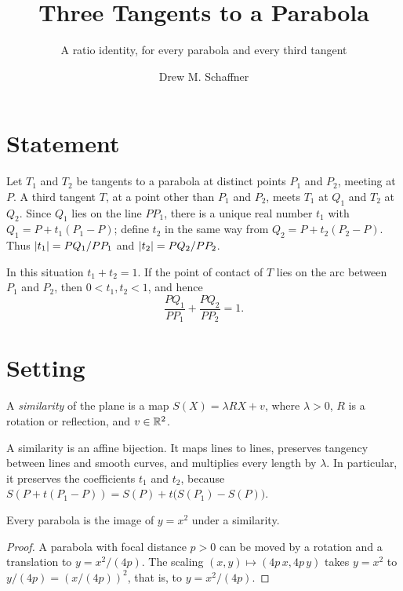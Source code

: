 \documentclass[11pt,a4paper]{article}
\title{Three Tangents to a Parabola}
\subtitle{A ratio identity, for every parabola and every third tangent}
\author{Drew M. Schaffner}
\begin{document}
\maketitle

\section{Statement}

Let $T_1$ and $T_2$ be tangents to a parabola at distinct points $P_1$ and $P_2$,
meeting at $P$. A third tangent $T$, at a point other than $P_1$ and $P_2$, meets
$T_1$ at $Q_1$ and $T_2$ at $Q_2$. Since $Q_1$ lies on the line $PP_1$, there is a
unique real number $t_1$ with $Q_1 = P + t_1 (P_1 - P)$; define $t_2$ in the same way
from $Q_2 = P + t_2 (P_2 - P)$. Thus $\lvert t_1\rvert = PQ_1 / PP_1$ and
$\lvert t_2\rvert = PQ_2 / PP_2$.

\begin{theorem}\label{thm:main}
  In this situation $t_1 + t_2 = 1$. If the point of contact of $T$ lies on the arc
  between $P_1$ and $P_2$, then $0 < t_1, t_2 < 1$, and hence
  \[
    \frac{PQ_1}{PP_1} + \frac{PQ_2}{PP_2} = 1.
  \]
\end{theorem}

\section{Setting}

\begin{definition}[Similarity]\label{def:similarity}
  A \emph{similarity} of the plane is a map $S(X) = \lambda R X + v$, where
  $\lambda > 0$, $R$ is a rotation or reflection, and $v \in \mathbb{R}^2$.
\end{definition}

A similarity is an affine bijection. It maps lines to lines, preserves tangency
between lines and smooth curves, and multiplies every length by $\lambda$. In
particular, it preserves the coefficients $t_1$ and $t_2$, because
$S(P + t (P_1 - P)) = S(P) + t \bigl( S(P_1) - S(P) \bigr)$.

\begin{lemma}\label{lem:normal-form}
  Every parabola is the image of $y = x^2$ under a similarity.
\end{lemma}

\begin{proof}
  A parabola with focal distance $p > 0$ can be moved by a rotation and a
  translation to $y = x^2 / (4p)$. The scaling $(x, y) \mapsto (4p\,x, 4p\,y)$ takes
  $y = x^2$ to $y/(4p) = (x/(4p))^2$, that is, to $y = x^2/(4p)$.
\end{proof}
\end{document}
